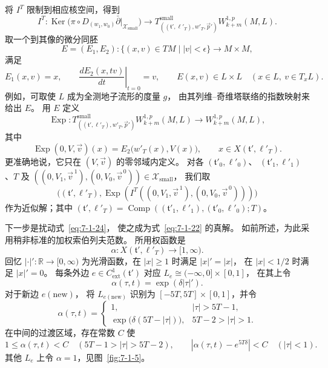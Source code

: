 将 $I^T$ 限制到相应核空间，得到
\[
I^T\colon
\operatorname{Ker}\bigl(
\pi\circ D_{(w_1,w_0)}\bar\partial
\vert_{\mathcal X_{\mathrm{small}}}\bigr)
\longrightarrow
T^{\mathrm{small}}_{((\mathfrak t',\ell'_T),w'_T,\vec p')}
W_{k+m}^{1,p}(M,L).
\]
取一个到其像的微分同胚
\[
E=(E_1,E_2)\colon
\{(x,v)\in TM\mid |v|<\epsilon\}\longrightarrow M\times M,
\]
满足
\[
E_1(x,v)=x,\qquad
\left.\frac{dE_2(x,tv)}{dt}\right|_{t=0}=v,
\qquad
E(x,v)\in L\times L\quad(x\in L,\ v\in T_xL).
\]
例如，可取使 $L$ 成为全测地子流形的度量 $g$，
由其列维--奇维塔联络的指数映射来给出 $E$。
用 $E$ 定义
\[
\operatorname{Exp}\colon
T^{\mathrm{small}}_{((\mathfrak t',\ell'_T),w'_T,\vec p')}
W_{k+m}^{1,p}(M,L)
\longrightarrow W_{k+m}^{1,p}(M,L),
\]
其中
\[
\operatorname{Exp}(0,V,\vec v)(x)
=E_2\bigl(w'_T(x),V(x)\bigr),
\qquad x\in X(\mathfrak t',\ell'_T).
\]
更准确地说，它只在 $(V,\vec v)$ 的零邻域内定义。
对各
$(\mathfrak t'_0,\ell'_0)$、
$(\mathfrak t'_1,\ell'_1)$、$T$
及
$((0,V_1,\vec v^{\,1}),(0,V_0,\vec v^{\,0}))
\in\mathcal X_{\mathrm{small}}$，
我们取
\begin{equation}
\bigl((\mathfrak t',\ell'_T),
\operatorname{Exp}(I^T((0,V_1,\vec v^{\,1}),
(0,V_0,\vec v^{\,0})))\bigr)
\tag{7.1.24}\label{eq:7-1-24}
\end{equation}
作为近似解；其中
$(\mathfrak t',\ell'_T)
=\operatorname{Comp}((\mathfrak t'_1,\ell'_1),
(\mathfrak t'_0,\ell'_0);T)$。

下一步是扰动式~\eqref{eq:7-1-24}，
使之成为式~\eqref{eq:7-1-22} 的真解。
如前所述，为此采用稍非标准的加权索伯列夫范数。
所用权函数是
\[
\alpha\colon X(\mathfrak t',\ell'_T)\longrightarrow[1,\infty).
\]
回忆 $|\cdot|'\colon\mathbb R\to[0,\infty)$
为光滑函数，在 $|x|\geq1$ 时满足 $|x|'=|x|$，
在 $|x|<1/2$ 时满足 $|x|'=0$。
每条外边 $e\in C^1_{\mathrm{ext}}(\mathfrak t')$
对应 $L_e\cong(-\infty,0]\times[0,1]$，
在其上令
\[
\alpha(\tau,t)=\exp(\delta|\tau|').
\]
对于新边 $e(\mathrm{new})$，
将 $L_{e(\mathrm{new})}$ 识别为
$[-5T,5T]\times[0,1]$，并令
\[
\alpha(\tau,t)=
\begin{cases}
1,&|\tau|>5T-1,\\
\exp\bigl(\delta(5T-|\tau|)\bigr),
 &5T-2>|\tau|>1.
\end{cases}
\]
在中间的过渡区域，存在常数 $C$ 使
\[
1\leq\alpha(\tau,t)<C
\quad(5T-1>|\tau|>5T-2),
\qquad
|\alpha(\tau,t)-e^{5T\delta}|<C
\quad(|\tau|<1).
\]
其他 $L_e$ 上令 $\alpha=1$，见图~\ref{fig:7-1-5}。

